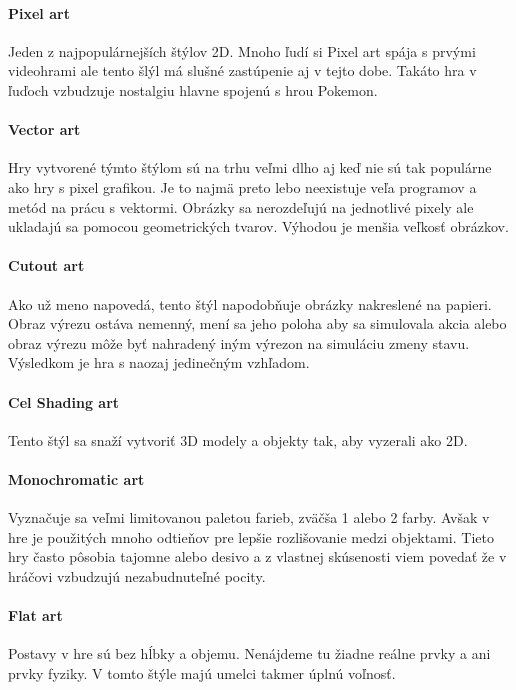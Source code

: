 \documentclass[10pt,twoside,slovak,a4paper]{article}
\begin{document}
\paragraph{Pixel art}
Jeden z najpopulárnejších štýlov 2D. Mnoho ľudí si Pixel art spája s prvými videohrami ale tento šlýl má slušné zastúpenie aj v tejto dobe. Takáto hra v ľuďoch vzbudzuje nostalgiu hlavne spojenú s hrou Pokemon.


\paragraph{Vector art}
Hry vytvorené týmto štýlom sú na trhu veľmi dlho aj keď nie sú tak populárne ako hry s pixel grafikou. Je to najmä preto lebo neexistuje veľa programov a metód na prácu s vektormi. Obrázky sa nerozdeľujú na jednotlivé pixely ale ukladajú sa pomocou geometrických tvarov. Výhodou je menšia veľkosť obrázkov.

\paragraph{Cutout art}
Ako už meno napovedá, tento štýl napodobňuje obrázky nakreslené na papieri. Obraz výrezu ostáva nemenný, mení sa jeho poloha aby sa simulovala akcia alebo obraz výrezu môže byť nahradený iným výrezon na simuláciu zmeny stavu. Výsledkom je hra s naozaj jedinečným vzhľadom.


\paragraph{Cel Shading art}
Tento štýl sa snaží vytvoriť 3D modely a objekty tak, aby vyzerali ako 2D.


\paragraph{Monochromatic art}
Vyznačuje sa veľmi limitovanou paletou farieb, zväčša 1 alebo 2 farby. Avšak v hre je použitých mnoho odtieňov pre lepšie rozlišovanie medzi objektami. Tieto hry často pôsobia tajomne alebo desivo a z vlastnej skúsenosti viem povedať že v hráčovi vzbudzujú nezabudnuteľné pocity.

\paragraph{Flat art}
Postavy v hre sú bez hĺbky a objemu. Nenájdeme tu žiadne reálne prvky a ani prvky fyziky. V tomto štýle majú umelci takmer úplnú voľnosť.
\end{document}
